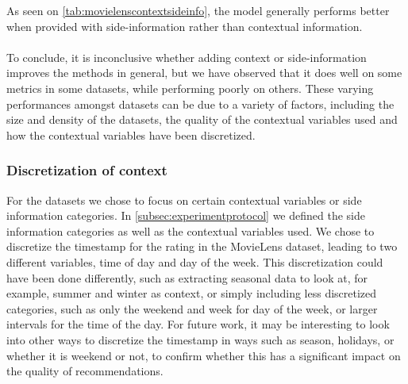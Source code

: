 As seen on \autoref{tab:movielenscontextsideinfo}, the model generally performs better when provided with side-information rather than contextual information.
\\\\
To conclude, it is inconclusive whether adding context or side-information improves the methods in general, but we have observed that it does well on some metrics in some datasets, while performing poorly on others.
These varying performances amongst datasets can be due to a variety of factors, including the size and density of the datasets, the quality of the contextual variables used and how the contextual variables have been discretized.\\

\subsubsection{Discretization of context}
For the datasets we chose to focus on certain contextual variables or side information categories.
In \autoref{subsec:experimentprotocol} we defined the side information categories as well as the contextual variables used.
We chose to discretize the timestamp for the rating in the MovieLens dataset, leading to two different variables, time of day and day of the week.
This discretization could have been done differently, such as extracting seasonal data to look at, for example, summer and winter as context, or simply including less discretized categories, such as only the weekend and week for day of the week, or larger intervals for the time of the day.
For future work, it may be interesting to look into other ways to discretize the timestamp in ways such as season, holidays, or whether it is weekend or not, to confirm whether this has a significant impact on the quality of recommendations.


